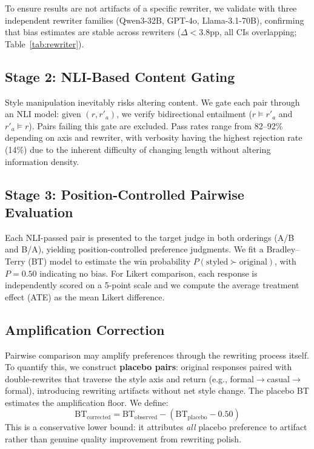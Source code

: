 \documentclass[11pt]{article}
\begin{document}
To ensure results are not artifacts of a specific rewriter, we validate with three independent rewriter families (Qwen3-32B, GPT-4o, Llama-3.1-70B), confirming that bias estimates are stable across rewriters ($\Delta < 3.8$pp, all CIs overlapping; Table~\ref{tab:rewriter}).

\subsection{Stage 2: NLI-Based Content Gating}

Style manipulation inevitably risks altering content. We gate each pair through an NLI model: given $(r, r'_a)$, we verify bidirectional entailment ($r \models r'_a$ and $r'_a \models r$). Pairs failing this gate are excluded. Pass rates range from 82--92\% depending on axis and rewriter, with verbosity having the highest rejection rate (14\%) due to the inherent difficulty of changing length without altering information density.

\subsection{Stage 3: Position-Controlled Pairwise Evaluation}

Each NLI-passed pair is presented to the target judge in both orderings (A/B and B/A), yielding position-controlled preference judgments. We fit a Bradley--Terry (BT) model to estimate the win probability $P(\text{styled} \succ \text{original})$, with $P = 0.50$ indicating no bias. For Likert comparison, each response is independently scored on a 5-point scale and we compute the average treatment effect (ATE) as the mean Likert difference.

\subsection{Amplification Correction}

Pairwise comparison may amplify preferences through the rewriting process itself. To quantify this, we construct \textbf{placebo pairs}: original responses paired with double-rewrites that traverse the style axis and return (e.g., formal$\to$casual$\to$formal), introducing rewriting artifacts without net style change. The placebo BT estimates the amplification floor. We define:
\begin{equation}
\text{BT}_{\text{corrected}} = \text{BT}_{\text{observed}} - (\text{BT}_{\text{placebo}} - 0.50)
\end{equation}
This is a conservative lower bound: it attributes \emph{all} placebo preference to artifact rather than genuine quality improvement from rewriting polish.
\end{document}
